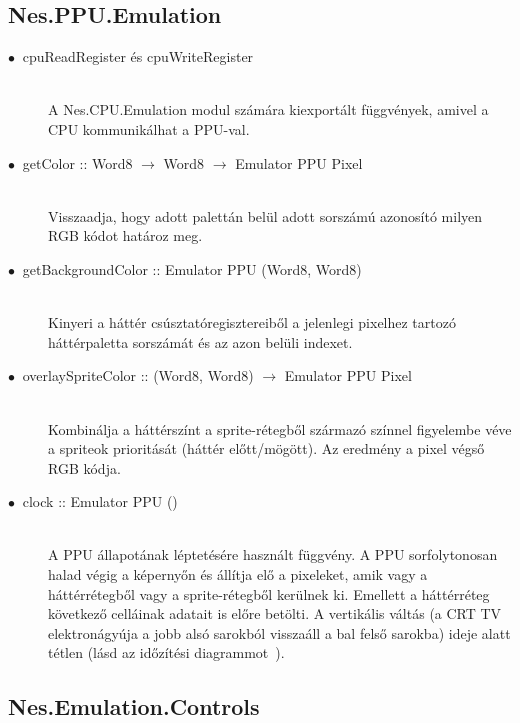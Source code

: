 \subsection{Nes.PPU.Emulation}

\begin{description}
	\item[$\bullet\:$ cpuReadRegister és cpuWriteRegister] \hfill \\
	A Nes.CPU.Emulation modul számára kiexportált függvények, amivel a CPU kommunikálhat a PPU-val.
	\item[$\bullet\:$ getColor :: Word8 $\rightarrow$ Word8 $\rightarrow$ Emulator PPU Pixel] \hfill \\
	Visszaadja, hogy adott palettán belül adott sorszámú azonosító milyen RGB kódot határoz meg.
	\item[$\bullet\:$ getBackgroundColor :: Emulator PPU (Word8, Word8)] \hfill \\
	Kinyeri a háttér csúsztatóregisztereiből a jelenlegi pixelhez tartozó háttérpaletta sorszámát és az azon belüli indexet.  
	\item[$\bullet\:$ overlaySpriteColor :: (Word8, Word8) $\rightarrow$ Emulator PPU Pixel] \hfill \\
	Kombinálja a háttérszínt a sprite-rétegből származó színnel figyelembe véve a spriteok prioritását (háttér előtt/mögött). Az eredmény a pixel végső RGB kódja.
	\item[$\bullet\:$ clock :: Emulator PPU ()] \hfill \\
	A PPU állapotának léptetésére használt függvény. A PPU sorfolytonosan halad végig a képernyőn és állítja elő a pixeleket, amik vagy a háttérrétegből vagy a sprite-rétegből kerülnek ki. Emellett a háttérréteg következő celláinak adatait is előre  betölti.
	A vertikális váltás (a CRT TV elektronágyúja a jobb alsó sarokból visszaáll a bal felső sarokba) ideje alatt tétlen (lásd az időzítési diagrammot~\cite{frametime}).
\end{description}

\subsection{Nes.Emulation.Controls}

